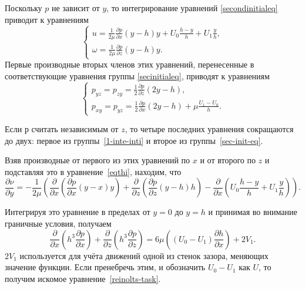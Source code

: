 \documentclass[12pt, a4paper]{article}
\begin{document}
Поскольку $p$ не зависит от $y$, то интегрирование уравнений \eqref{secondinitialeq} приводит к уравнениям
\begin{equation}
	\label{1-inte-inti}
	\begin{cases}
		u = \frac{1}{2 \mu} \frac{\partial p}{\partial x} \left( y - h \right) y + U_0 \frac{h - y}{h} + U_1 \frac{y}{h},\\
		\omega = \frac{1}{2 \mu} \frac{\partial p}{\partial z} (y - h) y.
	\end{cases}
\end{equation} 
Первые производные вторых членов этих уравнений, перенесенные в соответствующие уравнения группы \eqref{secinitialeq}, приводят
к уравнениям
\begin{equation}
	\label{sec-init-eq}
	\begin{cases}
		p_{yz} = p_{zy} = \frac{1}{2} \frac{\partial p}{\partial z} \left( 2y - h \right), \\
		p_{xy} = p_{yz} = \frac{1}{2} \frac{\partial p}{\partial x} \left( 2y - h \right) + \mu \frac{U_1 - U_0}{h}.
	\end{cases}
\end{equation}

Если $р$ считать независимым от $z$, то четыре последних
уравнения сокращаются до двух: первое из группы~\eqref{1-inte-inti} и
второе из группы~\eqref{sec-init-eq}.

Взяв производные от первого из этих уравнений по $x$ и
от второго по $z$ и подставляя это в уравнение~\eqref{eqthi}, находим, что
\begin{equation*}
		\frac{\partial \nu}{\partial y} = - \frac{1}{2 \mu} \left( \frac{\partial}{\partial x} \left( \frac{\partial p}{\partial x} (y - x) y \right) + \frac{\partial}{\partial z} \left( \frac{\partial p}{\partial z} (y - h) h \right) - \frac{\partial}{\partial x} \left( U_0 \frac{h - y}{h} + U_1 \frac{y}{h} \right) \right).
\end{equation*}

Интегрируя это уравнение в пределах от $y = 0$ до $y = h$ и
принимая во внимание граничные условия, получаем
\begin{equation*}
	\frac{\partial}{\partial x} \left( h^3 \frac{\partial p}{\partial x} \right) + \frac{\partial}{\partial z} \left( h^3 \frac{\partial p}{\partial z} \right) = 6 \mu \left( (U_0 - U_1) \frac{\partial h}{\partial x} \right) + 2 V_1.
\end{equation*}
$2 V_1$ используется для учёта движений одной из стенок зазора, меняющих значение функции. Если пренебречь этим, и обозначить $U_0 - U_1$ как $U$, то получим искомое уравнение~\eqref{reinolts-task}.
\end{document}
